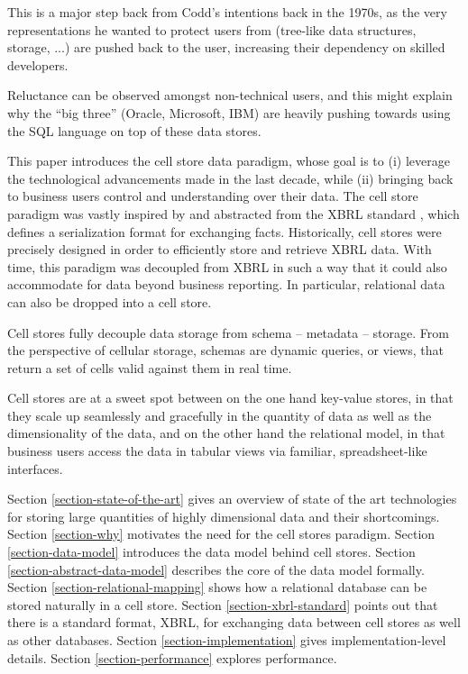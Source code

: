 \documentclass{acm_proc_article-sp}
\begin{document}
This is a major step back from Codd's intentions back in the 1970s, as the very representations he wanted to protect users from (tree-like data structures, storage, ...) are pushed back to the user, increasing their dependency on skilled developers.

Reluctance can be observed amongst non-technical users, and this might explain why the ``big three'' (Oracle, Microsoft, IBM) are heavily pushing towards using the SQL language \cite{Chamberlin1974} on top of these data stores.

This paper introduces the cell store data paradigm, whose goal is to (i) leverage the technological advancements made in the last decade, while (ii) bringing back to business users control and understanding over their data. The cell store paradigm was vastly inspired by and abstracted from the XBRL standard \cite{XBRL}, which defines a serialization format for exchanging facts. Historically, cell stores were precisely designed in order to efficiently store and retrieve XBRL data. With time, this paradigm was decoupled from XBRL in such a way that it could also accommodate for data beyond business reporting. In particular, relational data can also be dropped into a cell store.

Cell stores fully decouple data storage from schema -- metadata -- storage. From the perspective of cellular storage, schemas are dynamic queries, or views, that return a set of cells valid against them in real time.

Cell stores are at a sweet spot between on the one hand key-value stores, in that they scale up seamlessly and gracefully in the quantity of data as well as the dimensionality of the data, and on the other hand the relational model, in that business users access the data in tabular views via familiar, spreadsheet-like interfaces.

Section \ref{section-state-of-the-art} gives an overview of state of the art technologies for storing large quantities of highly dimensional data and their shortcomings. Section \ref{section-why} motivates the need for the cell stores paradigm. Section \ref{section-data-model} introduces the data model behind cell stores. Section \ref{section-abstract-data-model} describes the core of the data model formally. Section \ref{section-relational-mapping} shows how a relational database can be stored naturally in a cell store. Section \ref{section-xbrl-standard} points out that there is a standard format, XBRL, for exchanging data between cell stores as well as other databases. Section \ref{section-implementation} gives implementation-level details. Section \ref{section-performance} explores performance.
\end{document}

